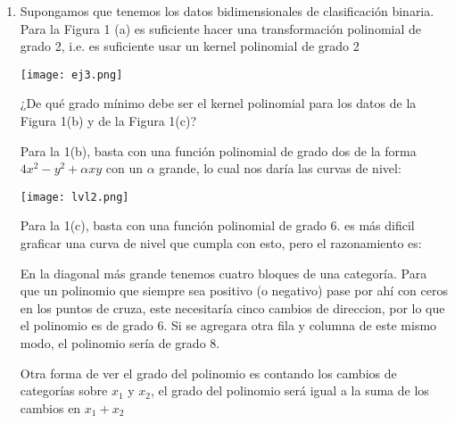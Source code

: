 \documentclass{article}
\begin{document}
\begin{enumerate}
\item Supongamos que tenemos los datos bidimensionales de clasificación binaria. Para la Figura 1 (a) es suficiente hacer una transformación polinomial de grado 2, i.e. es suficiente usar un kernel polinomial de grado 2

\begin{center}
\texttt{[image: ej3.png]}
\end{center}

¿De qué grado mínimo debe ser el kernel polinomial para los datos de la Figura 1(b) y de la Figura 1(c)?

Para la 1(b), basta con una función polinomial de grado dos de la forma $4x^2 - y^2 + \alpha xy$ con un $\alpha$ grande, lo cual nos daría las curvas de nivel:

\begin{center}
\texttt{[image: lvl2.png]}
\end{center}

Para la 1(c), basta con una función polinomial de grado 6. es más dificil graficar una curva de nivel que cumpla con esto, pero el razonamiento es:

En la diagonal más grande tenemos cuatro bloques de una categoría. Para que un polinomio que siempre sea positivo (o negativo) pase por ahí con ceros en los puntos de cruza, este necesitaría cinco cambios de direccion, por lo que el polinomio es de grado 6. Si se agregara otra fila y columna de este mismo modo, el polinomio sería de grado 8. 

Otra forma de ver el grado del polinomio es contando los cambios de categorías sobre $x_1$ y $x_2$, el grado del polinomio será igual a la suma de los cambios en $x_1 + x_2$

\end{enumerate}
\end{document}
